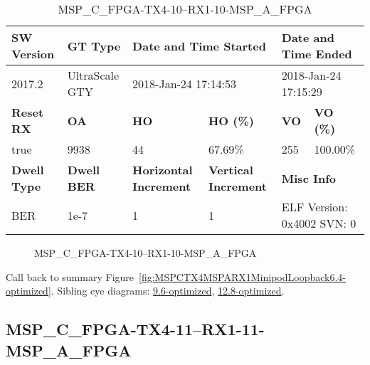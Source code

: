 \begin{table}[h]
\centering
\caption{MSP\_C\_FPGA-TX4-10--RX1-10-MSP\_A\_FPGA}
\label{tab:MSPCFPGATX410RX110MSPAFPGA6.4-optimized}
\begin{tabular}{@{}|l|l|l|l|l|l|@{}}
\toprule
\textbf{SW Version}                & \textbf{GT Type}   & \multicolumn{2}{l|}{\textbf{Date and Time Started}}            & \multicolumn{2}{l|}{\textbf{Date and Time Ended}}        \\ \midrule
2017.2                       & UltraScale GTY          & \multicolumn{2}{l|}{2018-Jan-24 17:14:53}                   & \multicolumn{2}{l|}{2018-Jan-24 17:15:29}               \\ \midrule
\textbf{Reset RX}                  & \textbf{OA} & \textbf{HO}   & \textbf{HO (\%)} & \textbf{VO} & \textbf{VO (\%)} \\ \midrule
true & 9938        & 44          & 67.69\%        & 255        & 100.00\%       \\ \midrule
\textbf{Dwell Type}                & \textbf{Dwell BER} & \textbf{Horizontal Increment} & \textbf{Vertical Increment}    & \multicolumn{2}{l|}{\textbf{Misc Info}}                  \\ \midrule
BER                            & 1e-7        & 1        & 1           & \multicolumn{2}{l|}{ELF Version: 0x4002 SVN: 0}                         \\ \bottomrule
\end{tabular}
\end{table}

\begin{figure}[h]
\caption{MSP\_C\_FPGA-TX4-10--RX1-10-MSP\_A\_FPGA} \label{fig:MSPCFPGATX410RX110MSPAFPGA6.4-optimized}
\end{figure}

Call back to summary Figure~\ref{fig:MSPCTX4MSPARX1MinipodLoopback6.4-optimized}.
Sibling eye diagrams: \hyperref[sec:MSPCFPGATX410RX110MSPAFPGA9.6-optimized]{9.6-optimized}, \hyperref[sec:MSPCFPGATX410RX110MSPAFPGA12.8-optimized]{12.8-optimized}.

\clearpage
\newpage


\subsection{MSP\_C\_FPGA-TX4-11--RX1-11-MSP\_A\_FPGA}\label{sec:MSPCFPGATX411RX111MSPAFPGA6.4-optimized}

